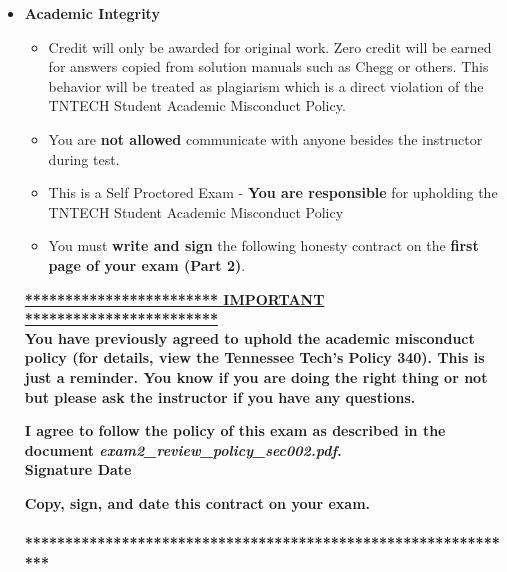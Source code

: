 \documentclass[11pt]{article}
\newcommand{\EXAMNUM}{2}
\begin{document}
\begin{itemize}
\begin{itemize}
	\end{itemize}

\newpage
		\item  \textbf{ \Large Academic Integrity}
\begin{itemize}

		\item {\B Credit will only be awarded for original work. Zero credit will be earned for answers copied from solution manuals such as Chegg or others. This behavior will be treated as plagiarism which is a direct violation of the TNTECH Student Academic Misconduct Policy.}

		\item  You are {\bf not allowed} communicate with anyone besides the instructor during test. 
		\item This is a Self Proctored Exam - {\bf You are responsible} for upholding the TNTECH Student Academic Misconduct Policy
		\item  You must {\bf write and sign} the following honesty contract on the {\bf first page of your exam (Part 2)}. 
		
		

\end{itemize}


 {\R  \bf \underline{************************ IMPORTANT ************************}} \vspace{3mm}\\
			  {\R \bf You have previously agreed to uphold the academic misconduct policy (for details, view the
Tennessee Tech’s Policy 340). This is just a reminder. You know if you are doing the right thing or not but please ask the instructor if you have any questions. }
\begin{framed}
	
	\vspace{3mm}	 \textbf{ I \underline{\hspace{50mm}} agree to follow the policy of this exam \vspc as described in the document {\it exam\EXAMNUM\_review\_policy\_sec002.pdf}.  }\vspace{3mm}\\
		 \textbf{\Large Signature \underline{\hspace{80mm}} Date\underline{\hspace{20mm} }}\\

\end{framed}
			{\R  \bf Copy, sign, and date this contract on your exam. }   \vspace{1mm}\\
			{\R  \bf \underline{\hspace{140mm}}} \\
			{\R  \bf ***************************************************************} 


\end{itemize}
\end{document}
